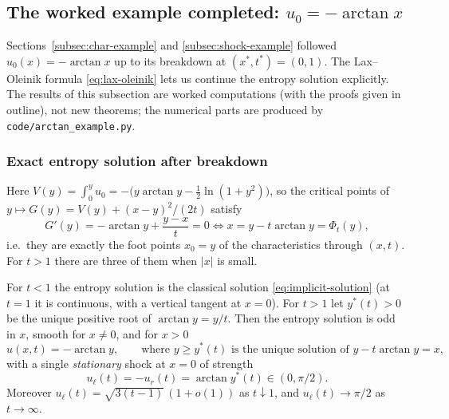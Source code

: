 
\subsection{The worked example completed: $u_0=-\arctan x$}
\label{subsec:arctan-complete}

Sections~\ref{subsec:char-example} and \ref{subsec:shock-example} followed
$u_0(x)=-\arctan x$ up to its breakdown at $(x^*,t^*)=(0,1)$. The
Lax--Oleinik formula \eqref{eq:lax-oleinik} lets us continue the entropy
solution explicitly. The results of this subsection are worked
computations (with the proofs given in outline), not new theorems; the
numerical parts are produced by \texttt{code/arctan\_example.py}.

\subsubsection{Exact entropy solution after breakdown}

Here $V(y)=\int_0^y u_0=-\big(y\arctan y-\tfrac12\ln(1+y^2)\big)$, so the
critical points of $y\mapsto G(y)=V(y)+(x-y)^2/(2t)$ satisfy
\begin{equation}
  \label{eq:arctan-critical}
  G'(y)=-\arctan y+\frac{y-x}{t}=0
  \iff x=y-t\arctan y=\Phi_t(y),
\end{equation}
i.e.\ they are exactly the foot points $x_0=y$ of the characteristics
through $(x,t)$. For $t>1$ there are three of them when $|x|$ is small.

\begin{proposition}[Entropy solution for $u_0=-\arctan x$]
\label{prop:arctan-solution}
For $t<1$ the entropy solution is the classical solution
\eqref{eq:implicit-solution} (at $t=1$ it is continuous, with a vertical
tangent at $x=0$). For $t>1$ let $y^*(t)>0$ be the unique
positive root of $\arctan y=y/t$. Then the entropy solution is odd in $x$,
smooth for $x\ne0$, and for $x>0$
\begin{equation}
  \label{eq:arctan-outer}
  u(x,t)=-\arctan y,\qquad\text{where } y\ge y^*(t)\text{ is the unique solution of }
  y-t\arctan y=x,
\end{equation}
with a single \emph{stationary} shock at $x=0$ of strength
\begin{equation}
  \label{eq:arctan-strength}
  u_\ell(t)=-u_r(t)=\arctan y^*(t)\in(0,\pi/2).
\end{equation}
Moreover $u_\ell(t)=\sqrt{3(t-1)}\,(1+o(1))$ as $t\downarrow1$, and
$u_\ell(t)\to\pi/2$ as $t\to\infty$.
\end{proposition}

